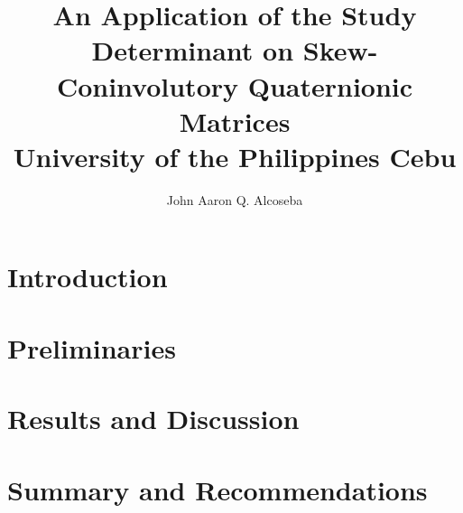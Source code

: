 \documentclass[12pt]{report}
\title{
	{An Application of the Study Determinant on Skew-Coninvolutory
	 Quaternionic Matrices}\\
	{\large University of the Philippines Cebu}\\
}
\author{John Aaron Q. Alcoseba}
\theoremstyle{definition}
\theoremstyle{theorem}
\theoremstyle{remark}
\begin{document}
	\tableofcontents

	\chapter{Introduction}
	

	\chapter{Preliminaries}
	

	\chapter{Results and Discussion}
	

	\chapter{Summary and Recommendations}
	

	
	
\end{document}
